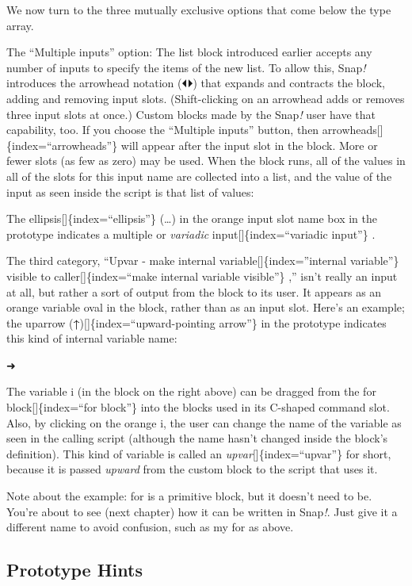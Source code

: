 \documentclass[
  letterpaper,
]{book}
\begin{document}
We now turn to the three mutually exclusive options that come below the
type array.

The ``Multiple inputs'' option: The list block introduced earlier
accepts any number of inputs to specify the items of the new list. To
allow this, Snap\emph{!} introduces the arrowhead notation (⏴⏵) that
expands and contracts the block, adding and removing input slots.
(Shift-clicking on an arrowhead adds or removes three input slots at
once.) Custom blocks made by the Snap\emph{!} user have that capability,
too. If you choose the ``Multiple inputs'' button, then
arrowheads{[}{]}\{index=``arrowheads''\} will appear after the input
slot in the block. More or fewer slots (as few as zero) may be used.
When the block runs, all of the values in all of the slots for this
input name are collected into a list, and the value of the input as seen
inside the script is that list of values:

The ellipsis{[}{]}\{index=``ellipsis''\} (\ldots) in the orange input
slot name box in the prototype indicates a multiple or \emph{variadic}
input{[}{]}\{index=``variadic input''\} .

The third category, ``Upvar - make internal
variable{[}{]}\{index=''internal variable''\} visible to
caller{[}{]}\{index=``make internal variable visible''\} ,'' isn't
really an input at all, but rather a sort of output from the block to
its user. It appears as an orange variable oval in the block, rather
than as an input slot. Here's an example; the uparrow
(\textbf{↑}){[}{]}\{index=``upward-pointing arrow''\} in the prototype
indicates this kind of internal variable name:

➜

The variable i (in the block on the right above) can be dragged from the
for block{[}{]}\{index=``for block''\} into the blocks used in its
C-shaped command slot. Also, by clicking on the orange i, the user can
change the name of the variable as seen in the calling script (although
the name hasn't changed inside the block's definition). This kind of
variable is called an \emph{upvar}{[}{]}\{index=``upvar''\} for short,
because it is passed \emph{upward} from the custom block to the script
that uses it.

Note about the example: for is a primitive block, but it doesn't need to
be. You're about to see (next chapter) how it can be written in
Snap\emph{!}. Just give it a different name to avoid confusion, such as
my for as above.

\subsection{Prototype Hints}\label{prototype-hints}
\end{document}
